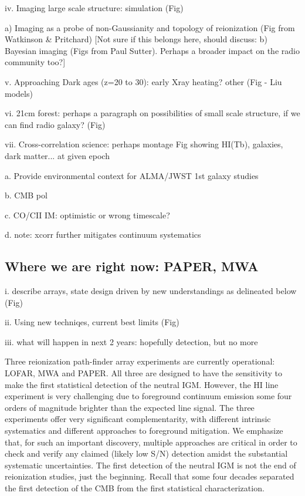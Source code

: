 \documentclass[preprint]{aastex}
\begin{document}
iv. Imaging large scale structure: simulation (Fig) 
    
a) Imaging as a probe of non-Gaussianity and topology of reionization (Fig from Watkinson & Pritchard)
[Not sure if this belongs here, should discuss: b) Bayesian imaging (Figs from Paul Sutter).  
Perhaps a broader impact on the radio community too?]

v. Approaching Dark ages (z=20 to 30): early Xray heating? other (Fig - Liu models)

vi. 21cm forest: perhaps a paragraph on possibilities of small scale structure, if we can find radio galaxy? (Fig) 

vii. Cross-correlation science: perhaps montage Fig showing HI(Tb), galaxies, dark matter... at given epoch

a. Provide environmental context for ALMA/JWST 1st galaxy studies

b. CMB pol 

c. CO/CII IM: optimistic or wrong timescale?
  
d. note: xcorr further mitigates continuum systematics

\subsection{Where we are right now: PAPER, MWA}  %

i. describe arrays, state design driven by new understandings as delineated below (Fig)

ii. Using new techniqes, current best limits  (Fig)

iii. what will happen in next 2 years: hopefully detection, but no more

Three reionization path-finder array experiments are currently
operational: LOFAR, MWA and PAPER. All three are designed to have the
sensitivity to make the first statistical detection of the neutral
IGM. However, the HI line experiment is very challenging due to
foreground continuum emission some four orders of magnitude brighter
than the expected line signal.  The three experiments offer very
significant complementarity, with different intrinsic systematics and
different approaches to foreground mitigation. We emphasize that, for
such an important discovery, multiple approaches are critical in order
to check and verify any claimed (likely low S/N) detection amidst the
substantial systematic uncertainties. The first detection of
the neutral IGM is not the end of reionization studies, just the 
beginning. Recall that some four decades separated the first detection
of the CMB from the first statistical characterization. 
\end{document}
